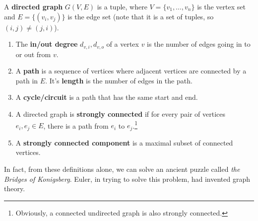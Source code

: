 \documentclass{article}
\begin{document}
    \begin{definition}
      A \textbf{directed graph} $G(V, E)$ is a tuple, where $V = \{v_1, \ldots, v_n\}$ is the vertex set and $E = \{(v_i, v_j)\}$ is the edge set (note that it is a set of tuples, so $(i, j) \neq ( j, i)$).
      \begin{enumerate}
        \item The \textbf{in/out degree} $d_{v, i}, d_{v, o}$ of a vertex $v$ is the number of edges going in to or out from $v$. 
        \item A \textbf{path} is a sequence of vertices where adjacent vertices are connected by a path in $E$. It's \textbf{length} is the number of edges in the path. 
        \item A \textbf{cycle/circuit} is a path that has the same start and end. 
        \item A directed graph is \textbf{strongly connected} if for every pair of vertices $e_i, e_j \in E$, there is a path from $e_i$ to $e_j$.\footnote{Obviously, a connected undirected graph is also strongly connected.}
        \item A \textbf{strongly connected component} is a maximal subset of connected vertices. 
      \end{enumerate}
    \end{definition}

    In fact, from these definitions alone, we can solve an ancient puzzle called \textit{the Bridges of Konigsberg}. Euler, in trying to solve this problem, had invented graph theory. 
\end{document}
